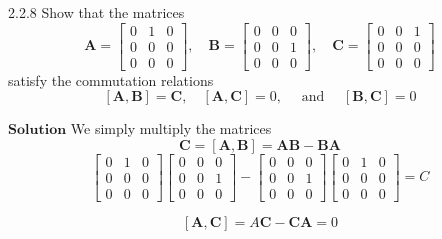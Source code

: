 \documentclass{article}
\begin{document}
\begin{flushleft}
\begin{mybox}{2.2.8}
Show that the matrices
$$\mathbf{A}=\begin{bmatrix}{0} & {1} & {0} \\ {0} & {0} & {0} \\ {0} & {0} & {0}\end{bmatrix}, \quad \mathbf{B}=\begin{bmatrix}{0} & {0} & {0} \\ {0} & {0} & {1} \\ {0} & {0} & {0}\end{bmatrix}, \quad \mathbf{C}=\begin{bmatrix}{0} & {0} & {1} \\ {0} & {0} & {0} \\ {0} & {0} & {0}\end{bmatrix}$$
satisfy the commutation relations
$$
[\mathbf{A}, \mathbf{B}]=\mathbf{C}, \quad[\mathbf{A}, \mathbf{C}]=0, \quad \text { and } \quad[\mathbf{B}, \mathbf{C}]=0
$$
\end{mybox}


$\boxed{\textbf{Solution}}$ We simply multiply the matrices
$$\mathbf{C}=[\mathbf{A}, \mathbf{B}] = \mathbf{\mathbf{AB}}- \mathbf{BA}$$
$$\begin{bmatrix}{0} & {1} & {0} \\ {0} & {0} & {0} \\ {0} & {0} & {0}\end{bmatrix} \begin{bmatrix}{0} & {0} & {0} \\ {0} & {0} & {1} \\ {0} & {0} & {0}\end{bmatrix} - \begin{bmatrix}{0} & {0} & {0} \\ {0} & {0} & {1} \\ {0} & {0} & {0}\end{bmatrix}\begin{bmatrix}{0} & {1} & {0} \\ {0} & {0} & {0} \\ {0} & {0} & {0}\end{bmatrix} = C$$

$$[\mathbf{A}, \mathbf{C}] = A\mathbf{C}-\mathbf{C}\mathbf{A} = 0$$


\end{flushleft}
\end{document}
